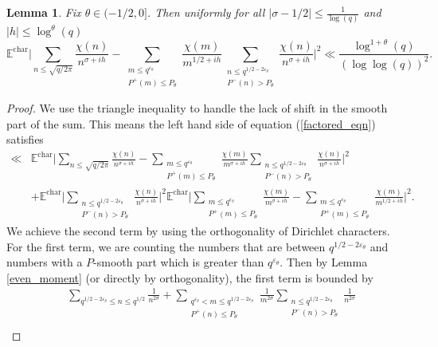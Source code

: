 \documentclass[10pt,a4paper]{amsart}
\newtheorem{lemma}{Lemma}
\numberwithin{equation}{section}
\begin{document}
\begin{lemma}
    Fix $\theta \in (-1/2,0]$. Then uniformly for all $|\sigma-1/2| \leq \frac{1}{\log(q)}$ and $|h| \leq \log^{\theta}(q)$
    \begin{equation}
        \mathbb{E}^{\text{char}}\big|\sum_{n \leq \sqrt{q/2\pi}}\frac{\chi(n)}{n^{\sigma+ih}}-\sum_{\substack{m \leq q^{\varepsilon_\theta} \\ P^+(m) \leq P_\theta}}\frac{\chi(m)}{m^{1/2+ih}}\sum_{\substack{n \leq q^{1/2-2\varepsilon_\theta} \\ P^-(n) > P_\theta}}\frac{\chi(n)}{n^{\sigma+ih}}\big|^2 \ll \frac{\log^{1+\theta}(q)}{(\log\log(q))^2}.  \label{factored_eqn}
    \end{equation} \label{factored_form}
\end{lemma}
\begin{proof}
    We use the triangle inequality to handle the lack of shift in the smooth part of the sum. This means the left hand side of equation (\ref{factored_eqn}) satisfies
    \begin{align*}
        \ll& \mathbb{E}^{\text{char}}\big|\sum_{n \leq \sqrt{q/2\pi}}\frac{\chi(n)}{n^{\sigma+ih}}-\sum_{\substack{m \leq q^{\varepsilon_\theta} \\ P^+(m) \leq P_\theta}}\frac{\chi(m)}{m^{\sigma+ih}}\sum_{\substack{n \leq q^{1/2-2\varepsilon_\theta} \\ P^-(n) > P_\theta}}\frac{\chi(n)}{n^{\sigma+ih}}\big|^2 \\
        &+ \mathbb{E}^{\text{char}}\big|\sum_{\substack{n \leq q^{1/2-2\varepsilon_\theta} \\ P^-(n) > P_\theta}}\frac{\chi(n)}{n^{\sigma+ih}}\big|^2\mathbb{E}^{\text{char}}\big|\sum_{\substack{m \leq q^{\varepsilon_\theta} \\ P^+(m) \leq P_\theta}}\frac{\chi(m)}{m^{\sigma+ih}}-\sum_{\substack{m \leq q^{\varepsilon_\theta} \\ P^+(m) \leq P_\theta}}\frac{\chi(m)}{m^{1/2+ih}}\big|^2.
    \end{align*}
    We achieve the second term by using the orthogonality of Dirichlet characters. For the first term, we are counting the numbers that are between $q^{1/2-2\varepsilon_\theta}$ and numbers with a $P$-smooth part which is greater than $q^{\varepsilon_\theta}$. Then by Lemma \ref{even_moment} (or directly by orthogonality), the first term is bounded by
    \begin{align*}
        &\sum_{q^{1/2-2\varepsilon_\theta} \leq n \leq q^{1/2}}  \frac{1}{n^{2\sigma}}+\sum_{\substack{q^{\varepsilon_\theta}< m \leq q^{1/2-2\varepsilon_\theta} \\ P^+(n) \leq P_\theta}}\frac{1}{m^{2\sigma}}\sum_{\substack{n \leq q^{1/2-2\varepsilon_\theta} \\ P^-(n) > P_\theta}}\frac{1}{n^{2\sigma}} \\

\end{align*}
\end{proof}
\end{document}
